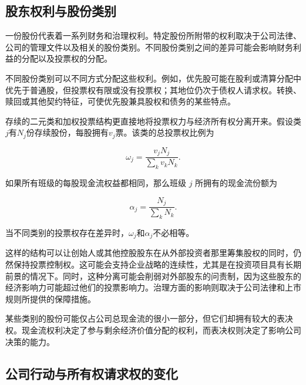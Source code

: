 \subsection{股东权利与股份类别}

一份股份代表着一系列财务和治理权利。特定股份所附带的权利取决于公司法律、公司的管理文件以及相关的股份类别。不同股份类别之间的差异可能会影响财务利益的分配以及投票权的分配。

不同股份类别可以不同方式分配这些权利。例如，优先股可能在股利或清算分配中优先于普通股，但投票权有限或没有投票权；其地位仍次于债权人请求权。转换、赎回或其他契约特征，可使优先股兼具股权和债务的某些特点。

存续的二元类和加权投票结构更直接地将投票权力与经济所有权分离开来。假设类\(j\)有\(N_j\)份存续股份，每股拥有\(v_j\)票。该类的总投票权比例为

\begin{equation}
\omega_j
=
\frac{v_jN_j}{\sum_k v_kN_k}.
\label{eq:ch9-voting-power}
\end{equation}

如果所有班级的每股现金流权益都相同，那么班级 \(j\) 所拥有的现金流份额为

\begin{equation}
\alpha_j
=
\frac{N_j}{\sum_k N_k}.
\label{eq:ch9-cash-flow-share}
\end{equation}

当不同类别的投票权存在差异时，\(\omega_j\)和\(\alpha_j\)不必相等。

这样的结构可以让创始人或其他控股股东在从外部投资者那里筹集股权的同时，仍然保持投票控制权。这可能会支持企业战略的连续性，尤其是在投资项目具有长期前景的情况下。同时，这种分离可能会削弱对外部股东的问责制，因为这些股东的经济影响力可能超过他们的投票影响力。治理方面的影响则取决于公司法律和上市规则所提供的保障措施。

\begin{tcolorbox}[
  enhanced,
  breakable,
  colback=white,
  colframe=FinanceBlue,
  boxrule=0.7pt,
  sharp corners,
  borderline west={2.2pt}{0pt}{FinanceBlue},
  title=\textbf{财务展望：现金流权益与投票权不必一致},
  coltitle=white,
  colbacktitle=FinanceBlue,
  fonttitle=\bfseries,
  before skip=1.2em,
  after skip=1.2em
]

某些类别的股份可能仅占公司总现金流的很小一部分，但它们却拥有较大的表决权。现金流权利决定了参与剩余经济价值分配的权利，而表决权则决定了影响公司决策的能力。

\end{tcolorbox}

\subsection{公司行动与所有权请求权的变化}

